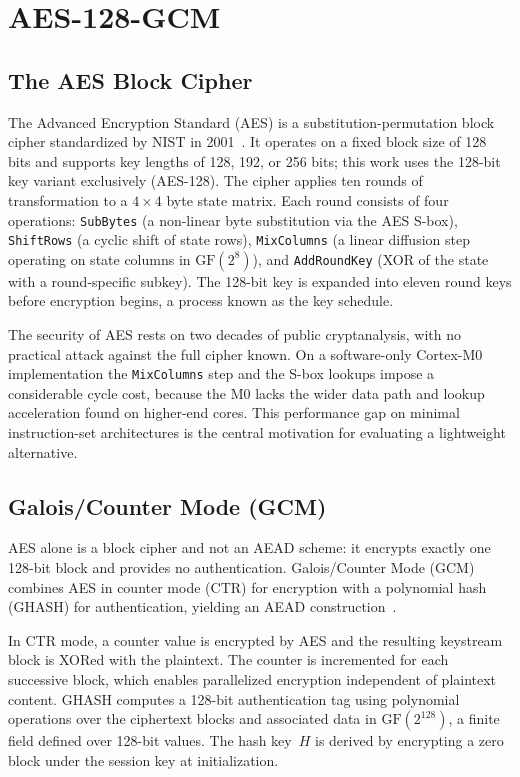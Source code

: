 \section{AES-128-GCM}

\subsection{The AES Block Cipher}

The Advanced Encryption Standard (AES) is a substitution-permutation block
cipher standardized by NIST in 2001~\cite{FIPS197}.
It operates on a fixed block size of 128 bits and supports key lengths of 128,
192, or 256 bits; this work uses the 128-bit key variant exclusively
(AES-128).
The cipher applies ten rounds of transformation to a $4\times4$ byte state
matrix.
Each round consists of four operations: \texttt{SubBytes} (a non-linear byte
substitution via the AES S-box), \texttt{ShiftRows} (a cyclic shift of state
rows), \texttt{MixColumns} (a linear diffusion step operating on state columns
in $\mathrm{GF}(2^8)$), and \texttt{AddRoundKey} (XOR of the state with a
round-specific subkey).
The 128-bit key is expanded into eleven round keys before encryption begins,
a process known as the key schedule.

The security of AES rests on two decades of public cryptanalysis, with no
practical attack against the full cipher known.
On a software-only Cortex-M0 implementation the \texttt{MixColumns} step and the
S-box lookups impose a considerable cycle cost, because the M0 lacks the wider
data path and lookup acceleration found on higher-end cores.
This performance gap on minimal instruction-set architectures is the central
motivation for evaluating a lightweight alternative.

\subsection{Galois/Counter Mode (GCM)}

AES alone is a block cipher and not an AEAD scheme: it encrypts exactly one
128-bit block and provides no authentication.
Galois/Counter Mode (GCM) combines AES in counter mode (CTR) for encryption
with a polynomial hash (GHASH) for authentication, yielding an AEAD
construction~\cite{NISTSP80038D}.

In CTR mode, a counter value is encrypted by AES and the resulting keystream
block is XORed with the plaintext.
The counter is incremented for each successive block, which enables
parallelized encryption independent of plaintext content.
GHASH computes a 128-bit authentication tag using polynomial operations over
the ciphertext blocks and associated data in $\mathrm{GF}(2^{128})$, a finite
field defined over 128-bit values.
The hash key~$H$ is derived by encrypting a zero block under the session key
at initialization.


